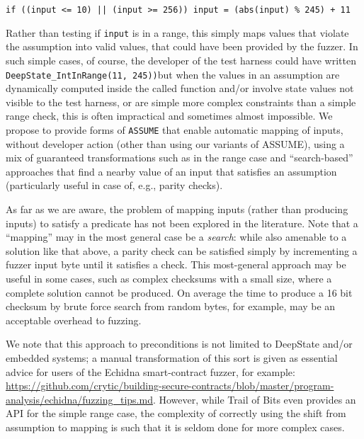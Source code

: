   {\tt if ((input <= 10) || (input >= 256)) input = (abs(input) \% 245) + 11}

  Rather than testing if {\tt input} is in a range, this simply maps values that violate the assumption into valid values, that could have been provided by the fuzzer.  In such simple cases, of course, the developer of the test harness could have written {\tt DeepState\_IntInRange(11, 245))}but when the values in an assumption are dynamically computed inside the called function and/or involve state values not visible to the test harness, or are simple more complex constraints than a simple range check, this is often impractical and sometimes almost impossible.  We propose to provide forms of {\tt ASSUME} that enable automatic mapping of inputs, without developer action (other than using our variants of ASSUME), using a mix of guaranteed transformations such as in the range case and ``search-based'' approaches that find a nearby value of an input that satisfies an assumption (particularly useful in case of, e.g., parity checks).

As far as we are aware, the problem of mapping inputs (rather than producing inputs) to satisfy a predicate has not been explored in the literature.  Note that a ``mapping'' may in the most general case be a \emph{search}: while also amenable to a solution like that above, a parity check can be satisfied simply by incrementing a fuzzer input byte until it satisfies a check.  This most-general approach may be useful in some cases, such as complex checksums with a small size, where a complete solution cannot be produced.  On average the time to produce a 16 bit checksum by brute force search from random bytes, for example, may be an acceptable overhead to fuzzing.

 We note that this approach to preconditions is not limited to DeepState and/or embedded systems; a manual transformation of this sort is given as essential advice for users of the Echidna smart-contract fuzzer, for example: \url{https://github.com/crytic/building-secure-contracts/blob/master/program-analysis/echidna/fuzzing_tips.md}.  However, while Trail of Bits even provides an API for the simple range case, the complexity of correctly using the shift from assumption to mapping is such that it is seldom done for more complex cases.
  
